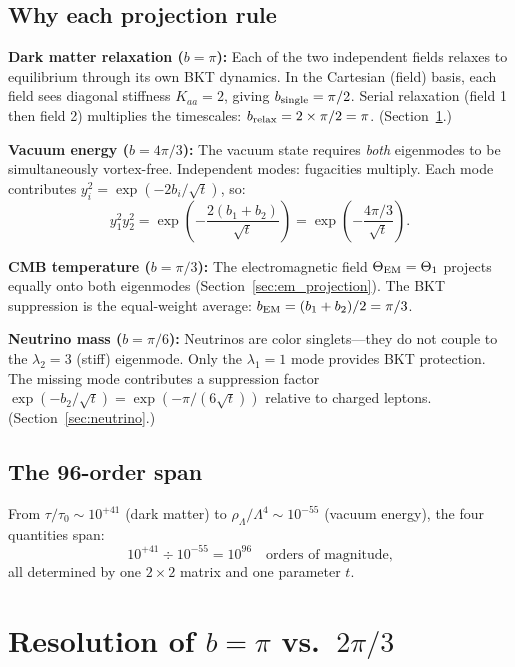 \documentclass[twocolumn,preprintnumbers,amsmath,amssymb,prd]{revtex4-2}
\begin{document}
\subsection{Why each projection rule}

\textbf{Dark matter relaxation ($b = \pi$):}
Each of the two independent fields relaxes to equilibrium through its own BKT dynamics.
In the Cartesian (field) basis, each field sees diagonal stiffness $K_{aa} = 2$, giving $b_{\rm single} = \pi/2$.
Serial relaxation (field 1 then field 2) multiplies the timescales: $b_{\rm relax} = 2 \times \pi/2 = \pi$. (Section~\ref{sec:b_resolution}.)

\textbf{Vacuum energy ($b = 4\pi/3$):}
The vacuum state requires \emph{both} eigenmodes to be simultaneously vortex-free.
Independent modes: fugacities multiply.
Each mode contributes $y_i^2 = \exp(-2b_i/\sqrt{t})$, so:
\begin{equation}
y_1^2 y_2^2 = \exp\!\left(-\frac{2(b_1+b_2)}{\sqrt{t}}\right) = \exp\!\left(-\frac{4\pi/3}{\sqrt{t}}\right).
\end{equation}

\textbf{CMB temperature ($b = \pi/3$):}
The electromagnetic field $\Theta_{\rm EM} = \Theta_1$ projects equally onto both eigenmodes (Section~\ref{sec:em_projection}).
The BKT suppression is the equal-weight average: $b_{\rm EM} = (b_1 + b_2)/2 = \pi/3$.

\textbf{Neutrino mass ($b = \pi/6$):}
Neutrinos are color singlets---they do not couple to the $\lambda_2 = 3$ (stiff) eigenmode.
Only the $\lambda_1 = 1$ mode provides BKT protection.
The missing mode contributes a suppression factor $\exp(-b_2/\sqrt{t}) = \exp(-\pi/(6\sqrt{t}))$ relative to charged leptons. (Section~\ref{sec:neutrino}.)

\subsection{The 96-order span}

From $\tau/\tau_0 \sim 10^{+41}$ (dark matter) to $\rho_\Lambda/\Lambda^4 \sim 10^{-55}$ (vacuum energy), the four quantities span:
\begin{equation}
10^{+41} \div 10^{-55} = 10^{96}\quad\text{orders of magnitude,}
\end{equation}
all determined by one $2\times 2$ matrix and one parameter $t$.

\section{Resolution of $b = \pi$ vs.\ $2\pi/3$}
\label{sec:b_resolution}
\end{document}
